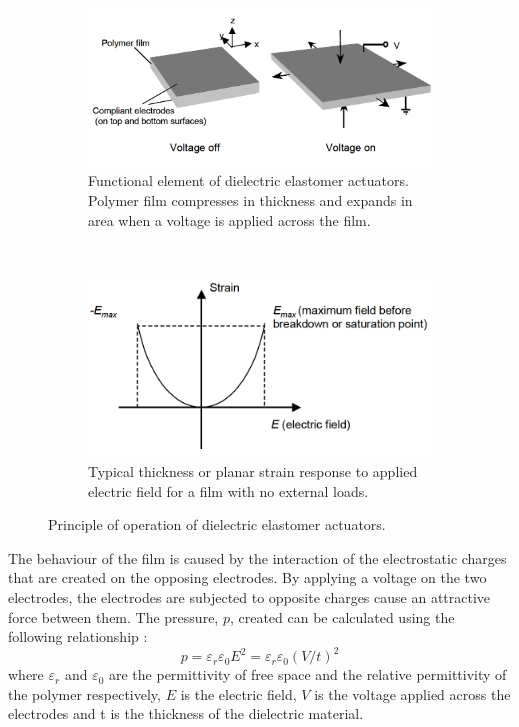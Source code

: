 \begin{figure}[H]
    \centering
    \begin{subfigure}[t]{0.45\textwidth}
			\includegraphics[width=\textwidth]{Figures/DEAP_fig.png}
			\caption{Functional element of dielectric elastomer actuators. Polymer film compresses in thickness and expands in area when a voltage is applied across the film.}
			\label{fig:DEAP_fig}
    \end{subfigure}
    ~ %
    \begin{subfigure}[t]{0.45\textwidth}
			\includegraphics[width=\textwidth]{Figures/DEAP_curve.png}
			\caption{Typical thickness or planar strain response to applied electric field for a film with no external loads.}
			\label{fig:DEAP_curve}
    \end{subfigure}
		\caption{Principle of operation of dielectric elastomer actuators\cite{kornbluh_electroelastomers:_2002}.}
		\label{fig:DEAP}
\end{figure}

The behaviour of the film is caused by the interaction of the electrostatic charges that are created on the opposing electrodes. By applying a voltage on the two electrodes, the electrodes are subjected to opposite charges cause an attractive force between them. The pressure, $p$, created can be calculated\cite{thummala_analysis_2012} using the following relationship :
\begin{equation}
	\label{eq:DEAP_p}
	p = \varepsilon_r\varepsilon_0E^2 = \varepsilon_r\varepsilon_0(V/t)^2
\end{equation}
where $\varepsilon_r$ and $\varepsilon_0$ are the permittivity of free space and the relative permittivity of the polymer respectively, $E$ is the electric field, $V$ is the voltage applied across the electrodes and t is the thickness of the dielectric material.

